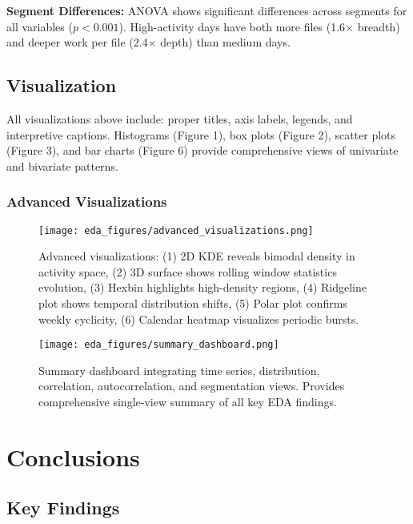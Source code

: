 \documentclass[11pt]{article}
\begin{document}
\textbf{Segment Differences:} ANOVA shows significant differences across segments for all variables ($p < 0.001$). High-activity days have both more files (1.6$\times$ breadth) and deeper work per file (2.4$\times$ depth) than medium days.

\subsection{Visualization}

All visualizations above include: proper titles, axis labels, legends, and interpretive captions. Histograms (Figure 1), box plots (Figure 2), scatter plots (Figure 3), and bar charts (Figure 6) provide comprehensive views of univariate and bivariate patterns.

\subsubsection{Advanced Visualizations}

\begin{figure}[H]
\centering
\texttt{[image: eda\_figures/advanced\_visualizations.png]}
\caption{Advanced visualizations: (1) 2D KDE reveals bimodal density in activity space, (2) 3D surface shows rolling window statistics evolution, (3) Hexbin highlights high-density regions, (4) Ridgeline plot shows temporal distribution shifts, (5) Polar plot confirms weekly cyclicity, (6) Calendar heatmap visualizes periodic bursts.}
\end{figure}

\begin{figure}[H]
\centering
\texttt{[image: eda\_figures/summary\_dashboard.png]}
\caption{Summary dashboard integrating time series, distribution, correlation, autocorrelation, and segmentation views. Provides comprehensive single-view summary of all key EDA findings.}
\end{figure}

\section{Conclusions}

\subsection{Key Findings}
\end{document}
